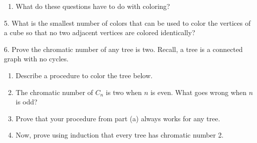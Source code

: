 \documentclass[10pt,]{book}
\theoremstyle{plain}
\theoremstyle{definition}
\numberwithin{equation}{chapter}
\newcommand{\vtx}[2]{node[fill,circle,inner sep=0pt, minimum size=4pt,label=#1:#2]{}}
\renewcommand{\v}{\vtx{above}{}}
\begin{document}
\begin{exerciselist}
\begin{enumerate}[label=(\alph*)]
\item\hypertarget{li-783}{}
					What do these questions have to do with coloring?


\end{enumerate}

\par\smallskip
\item[5.]\hypertarget{exercise-296}{}
What is the smallest number of colors that can be used to color the vertices of a cube so that no two adjacent vertices are colored identically?
%
\par\smallskip
\item[6.]\hypertarget{exercise-297}{}
			Prove the chromatic number of any tree is two.  Recall, a tree is a connected graph with no cycles.
		\leavevmode%
\begin{enumerate}[label=(\alph*)]
\item\hypertarget{li-784}{}
					Describe a procedure to color the tree below.
					\leavevmode%
\begin{figure}
\centering
{
}
\end{figure}


\item\hypertarget{li-785}{}
					The chromatic number of \(C_n\) is two when \(n\) is even. What goes wrong when \(n\) is odd?
\item\hypertarget{li-786}{}
					Prove that your procedure from part (a) always works for any tree.


\item\hypertarget{li-787}{}
					Now, prove using induction that every tree has chromatic number 2.


\end{enumerate}


\end{exerciselist}
\end{document}

